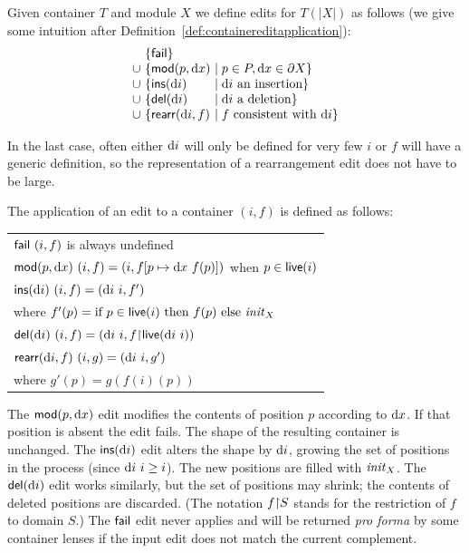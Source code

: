 \begin{defn}
  Given container $T$ and module $X$ we define edits for $T(|X|)$ as
  follows (we give some intuition after
  Definition~\ref{def:containereditapplication}):
  \[
  \begin{array}{l@{\ }l@{\ }l}
  &\{ \fail \}\\
  \cup & \{ \mlmod p\dx & \mid p\in P, \dx\in\partial X  \}\\
  \cup & \{ \mlinsert (\di) & \mid \di\text{ an insertion} \}\\
  \cup & \{ \mldelete (\di) & \mid \di\text{ a deletion} \}\\
  \cup & \{ \mlrearrange(\di,f) & \mid f\text{ consistent with }\di\}
  \end{array}
  \]
\end{defn}
In the last case, often either $\textrm{d} i$ will only be defined for very few
$i$ or $f$ will have a generic definition, so the representation of a
rearrangement edit does not have to be large.
\begin{defn}
\label{def:containereditapplication}
     The application of an edit to a container $(i,f)$ is defined as follows: 

    \begin{tabular}{l}
        $\fail \ (i,f) $ is always undefined  \\
        $\mathsf{mod}(p,\textrm{d} x) \  (i,f) = (i,f[p\mapsto\textrm{d} x\ f(p)])$ when $p\in\mathsf{live}(i)$ \\
        $\mlins\di \ (i,f) = (\di\ i,f')$ \\
        \qquad where $f'(p)=\text{if }p\in\mathsf{live}(i)\text{ then }f(p)\text{ else }\mathit{init}_X$\\[1.5ex]
        $\mldel\di \ (i,f) = (\di\ i,f\restrictedto\live(\di\ i))$ \\
        $\mlrearrange(\di,f) \ (i,g) = (\di\ i,g')$ \\
        \qquad where $g'(p) = g(f(i)(p))$
    \end{tabular}
\end{defn}
The $\mathsf{mod}(p,\textrm{d} x)$ edit modifies the contents of position $p$
according to $\textrm{d} x$. If that position is absent the edit fails.  The
shape of the resulting container is unchanged.
%
The $\mathsf{ins}(\textrm{d} i)$ edit alters the shape by $\textrm{d} i$, growing the set of
positions in the process (since $\textrm{d} i\ i\geq i$).  The new positions are
filled with $\mathit{init}_X$.
%
The $\mathsf{del}(\textrm{d} i)$ edit works similarly, but the set of positions may
shrink; the contents of deleted positions are discarded. (The notation
$f{\upharpoonright} S$ stands for the restriction of $f$ to domain $S$.)
%
The $\mathsf{fail}$ edit never applies and will be returned \emph{pro forma}
by some container lenses if the input edit does not match the current
complement.

